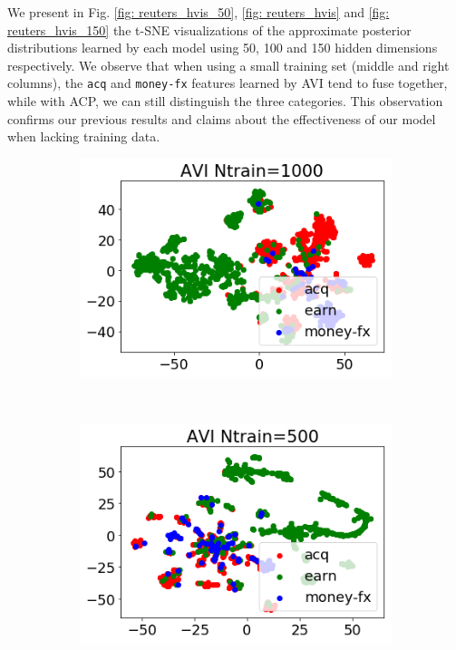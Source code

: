\documentclass[twoside]{article}
\begin{document}
We present in Fig. \ref{fig: reuters_hvis_50}, \ref{fig: reuters_hvis}  and \ref{fig: reuters_hvis_150} the t-SNE visualizations of the approximate posterior distributions learned by each model using 50, 100 and 150 hidden dimensions respectively. 
We observe that when using a small training set (middle and right columns), the \texttt{acq} and \texttt{money-fx} features learned by AVI tend to fuse together, while with ACP, we can still distinguish the three categories. 
This observation confirms our previous results and claims about the effectiveness of our model when lacking training data.

\begin{figure}
    \centering
    \begin{subfigure}[t]{0.33\textwidth}
        \centering
        \includegraphics[width=1.0\linewidth]{reuters_avi1000_h50.png}
        \label{fig: reuters_h50_avi_1000}
    \end{subfigure}%
    ~
    \begin{subfigure}[t]{0.33\textwidth}
        \centering
        \includegraphics[width=1.0\linewidth]{reuters_avi500_h50.png}

\end{subfigure}
\end{figure}
\end{document}

